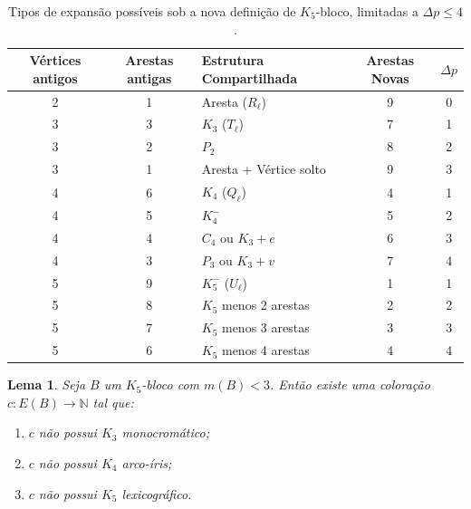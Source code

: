\documentclass[reqno, 12pt]{amsart}
\numberwithin{equation}{section}
\theoremstyle{plain}
\newtheorem{lemma}[theorem]{Lema}
\theoremstyle{definition}
\newcommand{\maxdens}{m}
\begin{document}
\begin{table}[h]
    \centering
    \begin{tabular}{|c|c|l|c|c|}
        \hline
        Vértices antigos & Arestas antigas & Estrutura Compartilhada & Arestas Novas & $\Delta p$ \\
        \hline
        2                & 1               & Aresta ($R_\ell$)       & 9             & 0          \\
        3                & 3               & $K_3$ ($T_\ell$)        & 7             & 1          \\
        3                & 2               & $P_2$                   & 8             & 2          \\
        3                & 1               & Aresta + Vértice solto  & 9             & 3          \\
        4                & 6               & $K_4$ ($Q_\ell$)        & 4             & 1          \\
        4                & 5               & $K_4^-$                 & 5             & 2          \\
        4                & 4               & $C_4$ ou $K_3 + e$      & 6             & 3          \\
        4                & 3               & $P_3$ ou $K_3 + v$      & 7             & 4          \\
        5                & 9               & $K_5^-$ ($U_\ell$)      & 1             & 1          \\
        5                & 8               & $K_5$ menos 2 arestas   & 2             & 2          \\
        5                & 7               & $K_5$ menos 3 arestas   & 3             & 3          \\
        5                & 6               & $K_5$ menos 4 arestas   & 4             & 4          \\
        \hline
    \end{tabular}
    \caption{Tipos de expansão possíveis sob a nova definição de $K_5$-bloco, limitadas a $\Delta p \leq 4$.}
    \label{tab:novas-expansoes}
\end{table}



\begin{lemma}
    \label{lem:0-statement-K5}
    Seja $B$ um $K_5$-bloco com $\maxdens(B) < 3$. Então existe uma coloração $c: E(B) \to \mathbb{N}$ tal que:
    \begin{enumerate}
        \item[(i)] $c$ não possui $K_3$ monocromático;
        \item[(ii)] $c$ não possui $K_4$ arco-íris;
        \item[(iii)] $c$ não possui $K_5$ lexicográfico.
    \end{enumerate}
\end{lemma}
\end{document}
